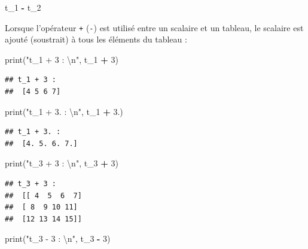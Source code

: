 \documentclass[12pt,]{book}
\newenvironment{Shaded}{\begin{snugshade}}{\end{snugshade}}
\newcommand{\DecValTok}[1]{\textcolor[rgb]{0.00,0.00,0.81}{#1}}
\newcommand{\CharTok}[1]{\textcolor[rgb]{0.31,0.60,0.02}{#1}}
\newcommand{\StringTok}[1]{\textcolor[rgb]{0.31,0.60,0.02}{#1}}
\newcommand{\OperatorTok}[1]{\textcolor[rgb]{0.81,0.36,0.00}{\textbf{#1}}}
\newcommand{\BuiltInTok}[1]{#1}
\newcommand{\NormalTok}[1]{#1}
\numberwithin{equation}{section}
\numberwithin{countremarque}{section}
\begin{document}
\begin{Shaded}
\begin{Highlighting}[]
\NormalTok{t_1 }\OperatorTok{-}\NormalTok{ t_2}
\end{Highlighting}
\end{Shaded}

Lorsque l'opérateur \texttt{+} (\texttt{-}) est utilisé entre un
scalaire et un tableau, le scalaire est ajouté (soustrait) à tous les
éléments du tableau :

\begin{Shaded}
\begin{Highlighting}[]
\BuiltInTok{print}\NormalTok{(}\StringTok{"t_1 + 3 : }\CharTok{\textbackslash{}n}\StringTok{"}\NormalTok{, t_1 }\OperatorTok{+} \DecValTok{3}\NormalTok{)}
\end{Highlighting}
\end{Shaded}

\begin{lstlisting}
## t_1 + 3 : 
##  [4 5 6 7]
\end{lstlisting}

\begin{Shaded}
\begin{Highlighting}[]
\BuiltInTok{print}\NormalTok{(}\StringTok{"t_1 + 3. : }\CharTok{\textbackslash{}n}\StringTok{"}\NormalTok{, t_1 }\OperatorTok{+} \DecValTok{3}\NormalTok{.)}
\end{Highlighting}
\end{Shaded}

\begin{lstlisting}
## t_1 + 3. : 
##  [4. 5. 6. 7.]
\end{lstlisting}

\begin{Shaded}
\begin{Highlighting}[]
\BuiltInTok{print}\NormalTok{(}\StringTok{"t_3 + 3 : }\CharTok{\textbackslash{}n}\StringTok{"}\NormalTok{, t_3 }\OperatorTok{+} \DecValTok{3}\NormalTok{)}
\end{Highlighting}
\end{Shaded}

\begin{lstlisting}
## t_3 + 3 : 
##  [[ 4  5  6  7]
##  [ 8  9 10 11]
##  [12 13 14 15]]
\end{lstlisting}

\begin{Shaded}
\begin{Highlighting}[]
\BuiltInTok{print}\NormalTok{(}\StringTok{"t_3 - 3 : }\CharTok{\textbackslash{}n}\StringTok{"}\NormalTok{, t_3 }\OperatorTok{-} \DecValTok{3}\NormalTok{)}
\end{Highlighting}
\end{Shaded}
\end{document}
